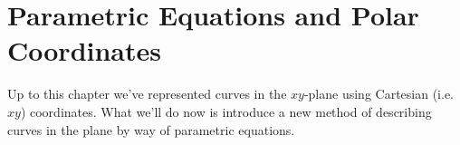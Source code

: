 \documentclass[10pt,]{book}
\numberwithin{equation}{section}
\begin{document}
\par\medskip\noindent
%
%
\typeout{************************************************}
\typeout{************************************************}
%
\chapter[{Parametric Equations and Polar Coordinates}]{Parametric Equations and Polar Coordinates}\label{parametric-polar}
\begin{introduction}{}%
\hypertarget{p-987}{}%
Up to this chapter we've represented curves in the \(xy\)-plane using Cartesian (i.e. \(xy\)) coordinates. What we'll do now is introduce a new method of describing curves in the plane by way of parametric equations.%
\end{introduction}%
%
%
\typeout{************************************************}
\typeout{************************************************}
%
\end{document}
